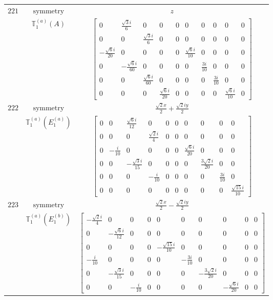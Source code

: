 \documentclass[fleqn,8pt,landscape]{jsarticle}
\begin{document}
\begin{longtable}{ccc}
$ 221 $ & $ \text{symmetry} $ & $ z $ \\
$  $ & $ \mathbb{T}_{1}^{(a)}(A) $ & $ \begin{bmatrix} 0 & \frac{\sqrt{3} i}{6} & 0 & 0 & 0 & 0 & 0 & 0 & 0 & 0 \\ 0 & 0 & \frac{\sqrt{3} i}{6} & 0 & 0 & 0 & 0 & 0 & 0 & 0 \\ - \frac{\sqrt{6} i}{20} & 0 & 0 & 0 & 0 & \frac{\sqrt{6} i}{10} & 0 & 0 & 0 & 0 \\ 0 & - \frac{\sqrt{6} i}{60} & 0 & 0 & 0 & 0 & \frac{3 i}{10} & 0 & 0 & 0 \\ 0 & 0 & \frac{\sqrt{6} i}{60} & 0 & 0 & 0 & 0 & \frac{3 i}{10} & 0 & 0 \\ 0 & 0 & 0 & \frac{\sqrt{6} i}{20} & 0 & 0 & 0 & 0 & \frac{\sqrt{6} i}{10} & 0 \end{bmatrix} $ \\ \hline
$ 222 $ & $ \text{symmetry} $ & $ \frac{\sqrt{2} x}{2} + \frac{\sqrt{2} i y}{2} $ \\
$  $ & $ \mathbb{T}_{1}^{(a)}(E_{1}^{(a)}) $ & $ \begin{bmatrix} 0 & 0 & \frac{\sqrt{6} i}{12} & 0 & 0 & 0 & 0 & 0 & 0 & 0 \\ 0 & 0 & 0 & \frac{\sqrt{2} i}{4} & 0 & 0 & 0 & 0 & 0 & 0 \\ 0 & - \frac{i}{10} & 0 & 0 & 0 & 0 & \frac{\sqrt{6} i}{20} & 0 & 0 & 0 \\ 0 & 0 & - \frac{\sqrt{3} i}{15} & 0 & 0 & 0 & 0 & \frac{3 \sqrt{2} i}{20} & 0 & 0 \\ 0 & 0 & 0 & - \frac{i}{10} & 0 & 0 & 0 & 0 & \frac{3 i}{10} & 0 \\ 0 & 0 & 0 & 0 & 0 & 0 & 0 & 0 & 0 & \frac{\sqrt{15} i}{10} \end{bmatrix} $ \\ \hline
$ 223 $ & $ \text{symmetry} $ & $ \frac{\sqrt{2} x}{2} - \frac{\sqrt{2} i y}{2} $ \\
$  $ & $ \mathbb{T}_{1}^{(a)}(E_{1}^{(b)}) $ & $ \begin{bmatrix} - \frac{\sqrt{2} i}{4} & 0 & 0 & 0 & 0 & 0 & 0 & 0 & 0 & 0 \\ 0 & - \frac{\sqrt{6} i}{12} & 0 & 0 & 0 & 0 & 0 & 0 & 0 & 0 \\ 0 & 0 & 0 & 0 & - \frac{\sqrt{15} i}{10} & 0 & 0 & 0 & 0 & 0 \\ - \frac{i}{10} & 0 & 0 & 0 & 0 & - \frac{3 i}{10} & 0 & 0 & 0 & 0 \\ 0 & - \frac{\sqrt{3} i}{15} & 0 & 0 & 0 & 0 & - \frac{3 \sqrt{2} i}{20} & 0 & 0 & 0 \\ 0 & 0 & - \frac{i}{10} & 0 & 0 & 0 & 0 & - \frac{\sqrt{6} i}{20} & 0 & 0 \end{bmatrix} $ \\ \hline

\end{longtable}
\end{document}
